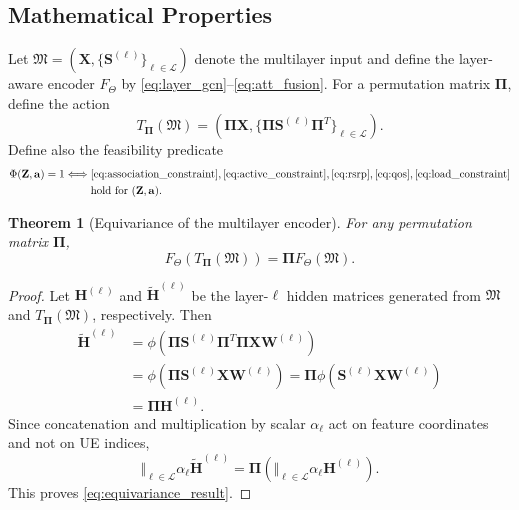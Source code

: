 \documentclass[journal]{IEEEtran}
\newtheorem{theorem}{Theorem}
\begin{document}
\subsection{Mathematical Properties}
Let $\mathfrak{M}=(\mathbf{X},\{\mathbf{S}^{(\ell)}\}_{\ell\in\mathcal{L}})$
denote the multilayer input and define the layer-aware encoder
$F_{\Theta}$ by \eqref{eq:layer_gcn}--\eqref{eq:att_fusion}. For a permutation
matrix $\boldsymbol{\Pi}$, define the action
\begin{equation}
    T_{\boldsymbol{\Pi}}(\mathfrak{M}) =
    \left(\boldsymbol{\Pi}\mathbf{X},
    \{\boldsymbol{\Pi}\mathbf{S}^{(\ell)}
    \boldsymbol{\Pi}^{T}\}_{\ell\in\mathcal{L}}\right).
\end{equation}
Define also the feasibility predicate
\begin{equation}
\begin{split}
    \Phi(\mathbf{Z},\mathbf{a})=1
    \Longleftrightarrow\;&
    \eqref{eq:association_constraint},\eqref{eq:active_constraint},
    \eqref{eq:rsrp},\eqref{eq:qos},\eqref{eq:load_constraint}\\
    &\text{hold for }(\mathbf{Z},\mathbf{a}).
\end{split}
\end{equation}

\begin{theorem}[Equivariance of the multilayer encoder]
For any permutation matrix $\boldsymbol{\Pi}$,
\begin{equation}
    F_{\Theta}\left(T_{\boldsymbol{\Pi}}(\mathfrak{M})\right)
    =\boldsymbol{\Pi}F_{\Theta}(\mathfrak{M}).
    \label{eq:equivariance_result}
\end{equation}
\end{theorem}
\begin{proof}
Let $\mathbf{H}^{(\ell)}$ and $\widetilde{\mathbf{H}}^{(\ell)}$ be the
layer-$\ell$ hidden matrices generated from $\mathfrak{M}$ and
$T_{\boldsymbol{\Pi}}(\mathfrak{M})$, respectively. Then
\begin{equation}
\begin{split}
\widetilde{\mathbf{H}}^{(\ell)}
&=\phi\left(\boldsymbol{\Pi}\mathbf{S}^{(\ell)}
\boldsymbol{\Pi}^{T}\boldsymbol{\Pi}\mathbf{X}\mathbf{W}^{(\ell)}\right)\\
&=\phi\left(\boldsymbol{\Pi}\mathbf{S}^{(\ell)}
\mathbf{X}\mathbf{W}^{(\ell)}\right)
=\boldsymbol{\Pi}\phi\left(\mathbf{S}^{(\ell)}
\mathbf{X}\mathbf{W}^{(\ell)}\right)\\
&=\boldsymbol{\Pi}\mathbf{H}^{(\ell)}.
\end{split}
\end{equation}
Since concatenation and multiplication by scalar $\alpha_{\ell}$ act on feature
coordinates and not on UE indices,
\begin{equation}
\Vert_{\ell\in\mathcal{L}}\alpha_{\ell}
\widetilde{\mathbf{H}}^{(\ell)}
=\boldsymbol{\Pi}\left(
\Vert_{\ell\in\mathcal{L}}\alpha_{\ell}\mathbf{H}^{(\ell)}\right).
\end{equation}
This proves \eqref{eq:equivariance_result}.
\end{proof}
\end{document}
